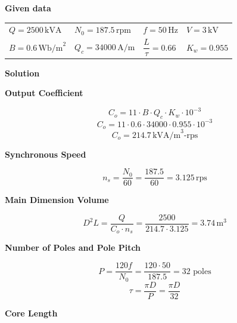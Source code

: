 \documentclass[12pt]{article}
\begin{document}
\vspace{10pt}

\noindent
\textbf{Given data}

\vspace{5pt}

\begin{center}
	\begin{tabular}{>{\raggedright\arraybackslash}p{4cm} >{\raggedright\arraybackslash}p{4cm} >{\raggedright\arraybackslash}p{4cm} >{\raggedright\arraybackslash}p{4cm}}
		$Q = 2500\, \text{kVA}$ & $N_0 = 187.5\, \text{rpm}$ & $f = 50\, \text{Hz}$ & $V = 3\, \text{kV}$ \\
		$B = 0.6\, \text{Wb/m}^2$ & $Q_c = 34000\, \text{A/m}$ & $\dfrac{L}{\tau} = 0.66$ & $K_w = 0.955$ \\
	\end{tabular}
\end{center}

\vspace{10pt}

\noindent
\textbf{Solution}

\vspace{5pt}

\noindent
\textbf{Output Coefficient}

\[
C_o = 11 \cdot B \cdot Q_c \cdot K_w \cdot 10^{-3}
\]
\[
C_o = 11 \cdot 0.6 \cdot 34000 \cdot 0.955 \cdot 10^{-3}
\]
\[
C_o = 214.7\, \text{kVA/m}^3\text{-rps}
\]

\vspace{5pt}

\noindent
\textbf{Synchronous Speed}

\[
n_s = \frac{N_0}{60} = \frac{187.5}{60} = 3.125\, \text{rps}
\]

\vspace{5pt}

\noindent
\textbf{Main Dimension Volume}

\[
D^2 L = \frac{Q}{C_o \cdot n_s} = \frac{2500}{214.7 \cdot 3.125} = 3.74\, \text{m}^3
\]

\vspace{5pt}

\noindent
\textbf{Number of Poles and Pole Pitch}

\[
P = \frac{120f}{N_0} = \frac{120 \cdot 50}{187.5} = 32 \text{ poles}
\]
\[
\tau = \frac{\pi D}{P} = \frac{\pi D}{32}
\]

\vspace{5pt}

\noindent
\textbf{Core Length}
\end{document}
